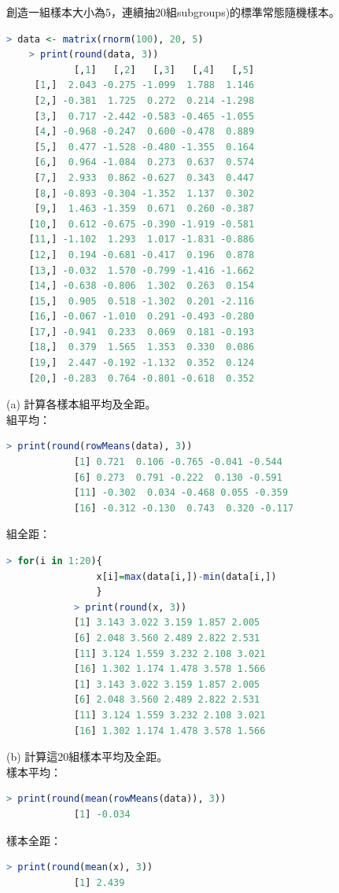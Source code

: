 創造一組樣本大小為5，連續抽20組subgroups)的標準常態隨機樣本。

\begin{lstlisting}[language=R]
    > data <- matrix(rnorm(100), 20, 5)
    > print(round(data, 3))
            [,1]   [,2]   [,3]   [,4]   [,5]
     [1,]  2.043 -0.275 -1.099  1.788  1.146
     [2,] -0.381  1.725  0.272  0.214 -1.298
     [3,]  0.717 -2.442 -0.583 -0.465 -1.055
     [4,] -0.968 -0.247  0.600 -0.478  0.889
     [5,]  0.477 -1.528 -0.480 -1.355  0.164
     [6,]  0.964 -1.084  0.273  0.637  0.574
     [7,]  2.933  0.862 -0.627  0.343  0.447
     [8,] -0.893 -0.304 -1.352  1.137  0.302
     [9,]  1.463 -1.359  0.671  0.260 -0.387
    [10,]  0.612 -0.675 -0.390 -1.919 -0.581
    [11,] -1.102  1.293  1.017 -1.831 -0.886
    [12,]  0.194 -0.681 -0.417  0.196  0.878
    [13,] -0.032  1.570 -0.799 -1.416 -1.662
    [14,] -0.638 -0.806  1.302  0.263  0.154
    [15,]  0.905  0.518 -1.302  0.201 -2.116
    [16,] -0.067 -1.010  0.291 -0.493 -0.280
    [17,] -0.941  0.233  0.069  0.181 -0.193
    [18,]  0.379  1.565  1.353  0.330  0.086
    [19,]  2.447 -0.192 -1.132  0.352  0.124
    [20,] -0.283  0.764 -0.801 -0.618  0.352
\end{lstlisting}


(a) 計算各樣本組平均及全距。\\
    組平均：
        \begin{lstlisting}[language=R]
            > print(round(rowMeans(data), 3))
            [1] 0.721  0.106 -0.765 -0.041 -0.544  
            [6] 0.273  0.791 -0.222  0.130 -0.591 
            [11] -0.302  0.034 -0.468 0.055 -0.359
            [16] -0.312 -0.130  0.743  0.320 -0.117
        \end{lstlisting}
    組全距：
        \begin{lstlisting}[language=R]
            > for(i in 1:20){
                x[i]=max(data[i,])-min(data[i,])
                }
            > print(round(x, 3))
            [1] 3.143 3.022 3.159 1.857 2.005 
            [6] 2.048 3.560 2.489 2.822 2.531 
            [11] 3.124 1.559 3.232 2.108 3.021 
            [16] 1.302 1.174 1.478 3.578 1.566
            [1] 3.143 3.022 3.159 1.857 2.005 
            [6] 2.048 3.560 2.489 2.822 2.531 
            [11] 3.124 1.559 3.232 2.108 3.021 
            [16] 1.302 1.174 1.478 3.578 1.566
        \end{lstlisting}  

(b) 計算這20組樣本平均及全距。\\
    樣本平均：
        \begin{lstlisting}[language=R]
            > print(round(mean(rowMeans(data)), 3))
            [1] -0.034
        \end{lstlisting}
    樣本全距：
        \begin{lstlisting}[language=R]
            > print(round(mean(x), 3))
            [1] 2.439
         \end{lstlisting}
                
